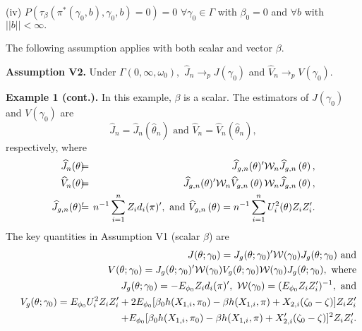 \documentclass[12pt,thmsb,titlepage,final,oneside,letterpaper]{article}
\begin{document}
\noindent (iv) $P(\tau _{\beta }(\pi ^{\ast }(\gamma _{0},b),\gamma
_{0},b)=0)=0$ $\forall \gamma _{0}\in \Gamma $ with $\beta _{0}=0$ and $%
\forall b$ with $||b||<\infty .$\medskip

The following assumption applies with both scalar and vector $\beta .$%
\medskip

\noindent \textbf{Assumption V2. }Under $\Gamma (0,\infty ,\omega _{0}),$ $%
\widehat{J}_{n}\rightarrow _{p}J(\gamma _{0})$ and $\widehat{V}%
_{n}\rightarrow _{p}V(\gamma _{0}).$\medskip

\noindent \textbf{Example 1 (cont.). }In this example, $\beta $ is a scalar.
The estimators of $J(\gamma _{0})$ and $V(\gamma _{0})$ are%
\begin{equation}
\widehat{J}_{n}=\widehat{J}_{n}(\widehat{\theta }_{n})\text{ and }\widehat{V}%
_{n}=\widehat{V}_{n}(\widehat{\theta }_{n}),
\end{equation}%
respectively, where%
\begin{eqnarray}
\widehat{J}_{n}(\theta )\hspace{-0.08in} &=&\hspace{-0.08in}\widehat{J}%
_{g,n}(\theta )^{\prime }\mathcal{W}_{n}\widehat{J}_{g,n}\left( \theta
\right) ,  \notag \\
\widehat{V}_{n}(\theta )\hspace{-0.08in} &=&\hspace{-0.08in}\widehat{J}%
_{g,n}(\theta )^{\prime }\mathcal{W}_{n}\widehat{V}_{g,n}\left( \theta
\right) \mathcal{W}_{n}\widehat{J}_{g,n}\left( \theta \right) ,  \notag \\
\widehat{J}_{g,n}(\theta )^{\prime }\hspace{-0.08in} &=&\hspace{-0.08in}%
n^{-1}\sum_{i=1}^{n}Z_{i}d_{i}(\pi )^{\prime },\text{ and }\widehat{V}%
_{g,n}\left( \theta \right) =n^{-1}\sum_{i=1}^{n}U_{i}^{2}(\theta
)Z_{i}Z_{i}^{\prime }.
\end{eqnarray}%
The key quantities in Assumption V1 (scalar $\beta $) are 
\begin{eqnarray}
&&J(\theta ;\gamma _{0})\overset{}{=}J_{g}(\theta ;\gamma _{0})^{\prime }%
\mathcal{W}(\gamma _{0})J_{g}(\theta ;\gamma _{0})\text{ and}  \notag \\
&&V(\theta ;\gamma _{0})\overset{}{=}J_{g}(\theta ;\gamma _{0})^{\prime }%
\mathcal{W}(\gamma _{0})V_{g}(\theta ;\gamma _{0})\mathcal{W}(\gamma
_{0})J_{g}(\theta ;\gamma _{0}),\text{ where}  \notag \\
&&J_{g}(\theta ;\gamma _{0})\overset{}{=}-E_{\phi _{0}}Z_{i}d_{i}(\pi
)^{\prime },\text{ }\mathcal{W}(\gamma _{0})\overset{}{=}(E_{\phi
_{0}}Z_{i}Z_{i}^{\prime })^{-1},\text{ and}  \label{gmm J and V} \\
&&V_{g}(\theta ;\gamma _{0})\overset{}{=}E_{\phi
_{0}}U_{i}^{2}Z_{i}Z_{i}^{\prime }+2E_{\phi _{0}}[\beta _{0}h(X_{1,i},\pi
_{0})-\beta h(X_{1,i},\pi )+X_{2,i}(\zeta _{0}-\zeta )]Z_{i}Z_{i}^{\prime } 
\notag \\
&&\hspace{0.78in}+E_{\phi _{0}}[\beta _{0}h(X_{1,i},\pi _{0})-\beta
h(X_{1,i},\pi )+X_{2,i}^{\prime }(\zeta _{0}-\zeta )]^{2}Z_{i}Z_{i}^{\prime
}.  \notag
\end{eqnarray}
\end{document}
